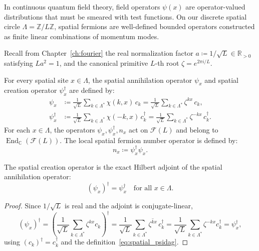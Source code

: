 In continuous quantum field theory, field operators $\psi(x)$ are operator-valued distributions that must be smeared with test functions. On our discrete spatial circle $\Lambda = \mathbb{Z}/L\mathbb{Z}$, spatial fermions are well-defined bounded operators constructed as finite linear combinations of momentum modes.

Recall from Chapter~\ref{ch:fourier} the real normalization factor $a \coloneqq 1/\sqrt{L} \in \mathbb{R}_{>0}$ satisfying $L a^2 = 1$, and the canonical primitive $L$-th root $\zeta = e^{2\pi i / L}$.

\begin{definition}
For every spatial site $x \in \Lambda$, the spatial annihilation operator $\psi_x$ and spatial creation operator $\psi_x^\dagger$ are defined by:
\begin{align}
\psi_x &\coloneqq \frac{1}{\sqrt{L}} \sum_{k \in \Lambda^*} \chi(k, x)\, c_k = \frac{1}{\sqrt{L}} \sum_{k \in \Lambda^*} \zeta^{k x}\, c_k, \label{eq:spatial_psi} \\
\psi_x^\dagger &\coloneqq \frac{1}{\sqrt{L}} \sum_{k \in \Lambda^*} \chi(-k, x)\, c_k^\dagger = \frac{1}{\sqrt{L}} \sum_{k \in \Lambda^*} \zeta^{-k x}\, c_k^\dagger. \label{eq:spatial_psidag}
\end{align}
For each $x\in\Lambda$, the operators $\psi_x,\psi_x^\dagger,n_x$ act on $\mathcal F(L)$ and belong to $\operatorname{End}_{\mathbb C}(\mathcal F(L))$. The local spatial fermion number operator is defined by:
\begin{equation}
n_x \coloneqq \psi_x^\dagger \psi_x.
\end{equation}
\end{definition}

\begin{lemma}
The spatial creation operator is the exact Hilbert adjoint of the spatial annihilation operator:
\begin{equation}
(\psi_x)^\dagger = \psi_x^\dagger \quad \text{for all } x \in \Lambda.
\end{equation}
\end{lemma}

\begin{proof}
Since $1/\sqrt L$ is real and the adjoint is conjugate-linear,
\begin{equation}
(\psi_x)^\dagger
=\left(\frac1{\sqrt L}\sum_{k\in\Lambda^*}\zeta^{kx}c_k\right)^\dagger
=\frac1{\sqrt L}\sum_{k\in\Lambda^*}\overline{\zeta^{kx}}\,c_k^\dagger
=\frac1{\sqrt L}\sum_{k\in\Lambda^*}\zeta^{-kx}c_k^\dagger
=\psi_x^\dagger,
\end{equation}
using $(c_k)^\dagger=c_k^\dagger$ and the definition~\eqref{eq:spatial_psidag}.
\end{proof}

